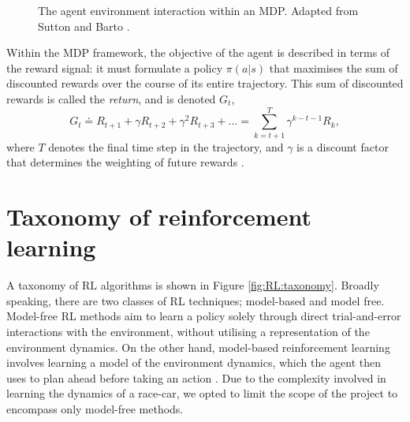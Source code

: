 \begin{figure}[!htb]
\centering

\caption[The agent environment interaction within an MDP]{The agent environment interaction within an MDP. Adapted from Sutton and Barto \cite{sutton2020}. }
\label{fig:agent_env_boundary}
\end{figure}


Within the MDP framework, the objective of the agent is described in terms of the reward signal: it must formulate a policy $\pi(a|s)$ that maximises the sum of discounted rewards over the course of its entire trajectory.
This sum of discounted rewards is called the \emph{return}, and is denoted $G_t$,
\begin{equation}
G_t \doteq R_{t+1} + \gamma R_{t+2} + \gamma^2 R_{t+3} + ... = \sum_{k=t+1}^{T} \gamma^{k-t-1} R_{k},
\label{eq:G_t_discount}
\end{equation}
where $T$ denotes the final time step in the trajectory, and $\gamma$ is a discount factor that determines the weighting of future rewards \cite{sutton2020}.
















\section{Taxonomy of reinforcement learning}

A taxonomy of RL algorithms is shown in Figure \ref{fig:RL:taxonomy}.
Broadly speaking, there are two classes of RL techniques; model-based and model free.
Model-free RL methods aim to learn a policy solely through direct trial-and-error interactions with the environment, without utilising a representation of the environment dynamics.
On the other hand, model-based reinforcement learning involves learning a model of the environment dynamics, which the agent then uses to plan ahead before taking an action \cite{wang2019benchmarking}.
Due to the complexity involved in learning the dynamics of a race-car, we opted to limit the scope of the project to encompass only model-free methods.

